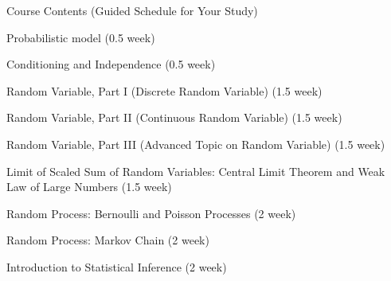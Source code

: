 \begin{frame}{Course Contents (Guided Schedule for Your Study)}

\plitemsep 0.1in


\small
\bce[1.]

\item Probabilistic model (0.5 week) 

\item Conditioning and Independence (0.5 week) 

\item Random Variable, Part I (Discrete Random Variable) (1.5 week)


\item Random Variable, Part II (Continuous Random Variable) (1.5 week)


\item Random Variable, Part III (Advanced Topic on Random Variable)
  (1.5 week) 


\item Limit of Scaled Sum of Random Variables: Central Limit Theorem
  and Weak Law of Large Numbers (1.5 week) 

\item Random Process: Bernoulli and Poisson Processes (2 week)


\item Random Process: Markov Chain (2 week) 

\item Introduction to Statistical Inference (2 week) 

  \ece

\end{frame}






